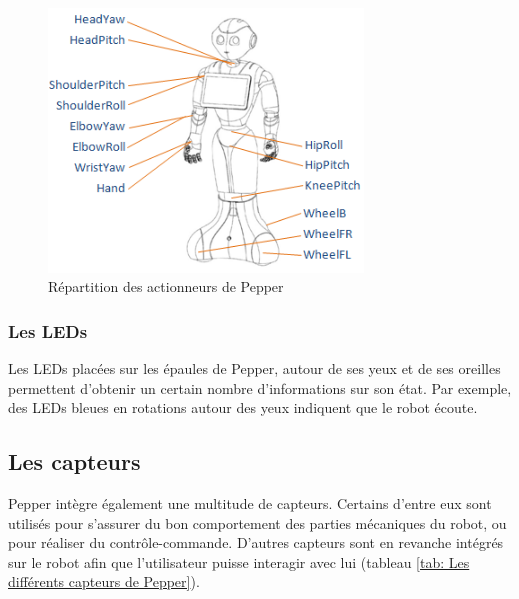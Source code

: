\begin{figure}[h]
	\centering\includegraphics[height=7cm]{images/pepper_motors.png}
	\caption{Répartition des actionneurs de Pepper}
	\label{fig:Répartition des actionneurs de Pepper}
\end{figure}

\subsubsection{Les LEDs}
\label{Introduction:Présentation du produit:Les actionneurs: Les leds}
Les LEDs placées sur les épaules de Pepper, autour de ses yeux et de ses oreilles permettent d'obtenir un certain nombre d'informations sur son état. Par exemple, des LEDs bleues en rotations autour des yeux indiquent que le robot écoute.

\subsection{Les capteurs}
\label{Introduction:Présentation du produit:Les capteurs}
Pepper intègre également une multitude de capteurs. Certains d'entre eux sont utilisés pour s'assurer du bon comportement des parties mécaniques du robot, ou pour réaliser du contrôle-commande. D'autres capteurs sont en revanche intégrés sur le robot afin que l'utilisateur puisse interagir avec lui (tableau \ref{tab: Les différents capteurs de Pepper}).

